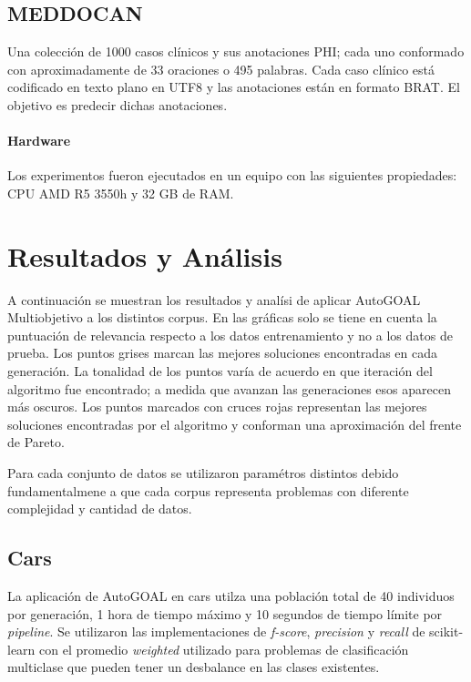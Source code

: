 \subsection{MEDDOCAN}

Una colecci\'on de 1000 casos cl\'inicos y sus anotaciones PHI; cada uno conformado con aproximadamente de 33 oraciones o 495 palabras. Cada caso cl\'inico est\'a codificado en texto plano en UTF8 y las anotaciones est\'an en formato BRAT. El objetivo es predecir dichas anotaciones.

\paragraph{Hardware} Los experimentos fueron ejecutados en un equipo con las siguientes propiedades: CPU AMD R5 3550h y 32 GB de RAM.

\section{Resultados y An\'alisis}

A continuaci\'on se muestran los resultados y anal\'isi de aplicar AutoGOAL Multiobjetivo a los distintos corpus. En las gr\'aficas solo se tiene en cuenta la puntuaci\'on de relevancia respecto a los datos entrenamiento y no a los datos de prueba. Los puntos  grises marcan las mejores soluciones encontradas en cada generaci\'on.  La tonalidad de los puntos var\'ia de acuerdo en que iteraci\'on del algoritmo fue encontrado; a medida que avanzan las generaciones esos aparecen m\'as oscuros. Los puntos marcados con cruces rojas representan las mejores soluciones encontradas por el algoritmo y conforman una aproximaci\'on del frente de Pareto.

Para cada conjunto de datos se utilizaron param\'etros distintos debido fundamentalmene a que cada corpus representa problemas con diferente complejidad y cantidad de datos.

\subsection{Cars}
La aplicaci\'on de AutoGOAL en cars  utilza una poblaci\'on total de 40 individuos por generaci\'on, 1 hora de tiempo m\'aximo y 10 segundos de tiempo l\'imite por \textit{pipeline}. Se utilizaron las implementaciones de \textit{f-score}, \textit{precision} y \textit{recall} de scikit-learn con el promedio \textit{weighted} utilizado para problemas de clasificaci\'on multiclase que pueden tener un desbalance en las clases existentes.

